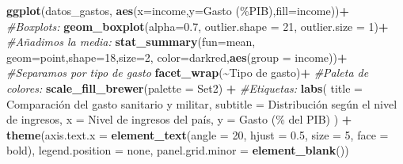 \documentclass[notspecified,article,submit,moreauthors,pdftex]{Definitions/mdpi}
\newenvironment{Shaded}{\begin{snugshade}}{\end{snugshade}}
\newcommand{\AttributeTok}[1]{\textcolor[rgb]{0.13,0.29,0.53}{#1}}
\newcommand{\CommentTok}[1]{\textcolor[rgb]{0.56,0.35,0.01}{\textit{#1}}}
\newcommand{\DecValTok}[1]{\textcolor[rgb]{0.00,0.00,0.81}{#1}}
\newcommand{\FloatTok}[1]{\textcolor[rgb]{0.00,0.00,0.81}{#1}}
\newcommand{\FunctionTok}[1]{\textcolor[rgb]{0.13,0.29,0.53}{\textbf{#1}}}
\newcommand{\NormalTok}[1]{#1}
\newcommand{\SpecialCharTok}[1]{\textcolor[rgb]{0.81,0.36,0.00}{\textbf{#1}}}
\newcommand{\StringTok}[1]{\textcolor[rgb]{0.31,0.60,0.02}{#1}}
\begin{document}
\begin{Shaded}
\begin{Highlighting}[]
\FunctionTok{ggplot}\NormalTok{(datos\_gastos, }\FunctionTok{aes}\NormalTok{(}\AttributeTok{x=}\NormalTok{income,}\AttributeTok{y=}\StringTok{\textasciigrave{}}\AttributeTok{Gasto (\%PIB)}\StringTok{\textasciigrave{}}\NormalTok{,}\AttributeTok{fill=}\NormalTok{income))}\SpecialCharTok{+}
  \CommentTok{\#Boxplots:}
  \FunctionTok{geom\_boxplot}\NormalTok{(}\AttributeTok{alpha=}\FloatTok{0.7}\NormalTok{, }\AttributeTok{outlier.shape =} \DecValTok{21}\NormalTok{, }\AttributeTok{outlier.size =} \DecValTok{1}\NormalTok{)}\SpecialCharTok{+}
  \CommentTok{\#Añadimos la media:}
  \FunctionTok{stat\_summary}\NormalTok{(}\AttributeTok{fun=}\NormalTok{mean, }\AttributeTok{geom=}\StringTok{\textquotesingle{}point\textquotesingle{}}\NormalTok{,}\AttributeTok{shape=}\DecValTok{18}\NormalTok{,}\AttributeTok{size=}\DecValTok{2}\NormalTok{, }\AttributeTok{color=}\StringTok{\textquotesingle{}darkred\textquotesingle{}}\NormalTok{,}\FunctionTok{aes}\NormalTok{(}\AttributeTok{group =}\NormalTok{ income))}\SpecialCharTok{+}
  \CommentTok{\#Separamos por tipo de gasto}
  \FunctionTok{facet\_wrap}\NormalTok{(}\SpecialCharTok{\textasciitilde{}}\StringTok{\textasciigrave{}}\AttributeTok{Tipo de gasto}\StringTok{\textasciigrave{}}\NormalTok{)}\SpecialCharTok{+}
  \CommentTok{\#Paleta de colores:}
  \FunctionTok{scale\_fill\_brewer}\NormalTok{(}\AttributeTok{palette =} \StringTok{\textquotesingle{}Set2\textquotesingle{}}\NormalTok{) }\SpecialCharTok{+}
  \CommentTok{\#Etiquetas:}
  \FunctionTok{labs}\NormalTok{(}
    \AttributeTok{title =} \StringTok{\textquotesingle{}Comparación del gasto sanitario y militar\textquotesingle{}}\NormalTok{,}
    \AttributeTok{subtitle =} \StringTok{\textquotesingle{}Distribución según el nivel de ingresos\textquotesingle{}}\NormalTok{,}
    \AttributeTok{x =} \StringTok{\textquotesingle{}Nivel de ingresos del país\textquotesingle{}}\NormalTok{,}
    \AttributeTok{y =} \StringTok{\textquotesingle{}Gasto (\% del PIB)\textquotesingle{}}
\NormalTok{  ) }\SpecialCharTok{+}
  \FunctionTok{theme}\NormalTok{(}\AttributeTok{axis.text.x =} \FunctionTok{element\_text}\NormalTok{(}\AttributeTok{angle =} \DecValTok{20}\NormalTok{, }\AttributeTok{hjust =} \FloatTok{0.5}\NormalTok{, }\AttributeTok{size =} \DecValTok{5}\NormalTok{, }\AttributeTok{face =} \StringTok{\textquotesingle{}bold\textquotesingle{}}\NormalTok{),}
        \AttributeTok{legend.position =} \StringTok{\textquotesingle{}none\textquotesingle{}}\NormalTok{, }
        \AttributeTok{panel.grid.minor =} \FunctionTok{element\_blank}\NormalTok{())}
\end{Highlighting}
\end{Shaded}
\end{document}
